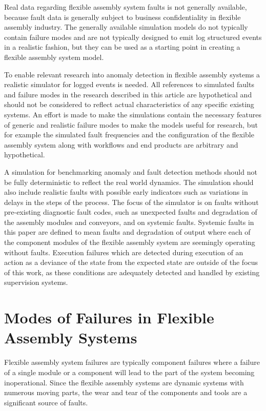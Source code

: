 \documentclass[journal]{IEEEtran}
\begin{document}
Real data regarding flexible assembly system faults is
not generally available, because fault data is generally subject to business confidentiality in flexible assembly industry.
The generally available simulation models do not typically contain failure modes and are not typically designed to emit
log structured events in a realistic fashion, but they can be used as a starting point in creating a flexible assembly system model.

To enable relevant research into anomaly detection in flexible assembly systems a realistic simulator for logged events is needed.
All references to simulated faults and failure modes in the research described in this article are hypothetical and should not be considered to
reflect actual characteristics of any specific existing systems. An effort is made to make the simulations contain the necessary features of
generic and realistic failure modes to make the models useful for research, but for example the simulated fault frequencies and the configuration
of the flexible assembly system along with workflows and end products are arbitrary and hypothetical.

A simulation for benchmarking anomaly and fault detection methods should not be fully deterministic to reflect the real world dynamics. The simulation should also
include realistic faults with possible early indicators such as variations in delays in the steps of the process. The focus of the simulator is on faults without pre-existing
diagnostic fault codes, such as unexpected faults and degradation of the assembly modules and conveyors, and on systemic faults. Systemic faults in this paper
are defined to mean faults and degradation of output where each of the component modules of the flexible assembly system are seemingly operating without faults. Execution failures
which are detected during execution of an action as a deviance of the state from the expected state are outside of the focus of this work, as these conditions are adequately detected and handled
by existing supervision systems.

\section{Modes of Failures in Flexible Assembly Systems}

Flexible assembly system failures are typically component failures where a failure of a single module or a component will lead to the part of the system becoming inoperational.
Since the flexible assembly systems are dynamic systems with numerous moving parts, the wear and tear of the components and tools are a significant source of faults.
\end{document}
